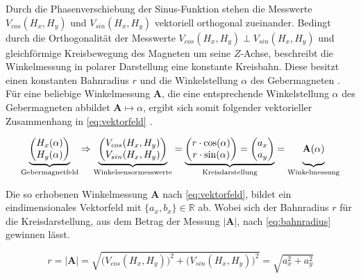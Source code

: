 Durch die Phasenverschiebung der Sinus-Funktion stehen die Messwerte $V_{cos}(H_x,H_y)$ und $V_{sin}(H_x,H_y)$ 
vektoriell orthogonal zueinander. Bedingt durch die Orthogonalität der Messwerte $V_{cos}(H_x,H_y) \perp 
V_{sin}(H_x,H_y)$ und gleichförmige Kreisbewegung des Magneten um seine $Z$-Achse, beschreibt die Winkelmessung in 
polarer Darstellung eine konstante Kreisbahn. Diese besitzt einen konstanten Bahnradius $r$ und die Winkelstellung 
$\alpha$ des Gebermagneten \cite{Schuethe2019}.
\newline
Für eine beliebige Winkelmessung $\mathbf{A}$, die eine entsprechende Winkelstellung $\alpha$ des Gebermagneten 
abbildet $\mathbf{A}\mapsto\alpha$, ergibt sich somit folgender vektorieller Zusammenhang in \autoref{eq:vektorfeld} 
\cite{Schuethe2020}.


\begin{equation}\label{eq:vektorfeld}
\underbrace{\begin{pmatrix} H_x(\alpha) \\ H_y(\alpha) \end{pmatrix}}_{\textrm{Gebermagnetfeld}}\Rightarrow
\underbrace{
	\begin{pmatrix} V_{cos}(H_x,H_y) \\ V_{sin}(H_x,H_y) \end{pmatrix}}_{\textrm{Winkelsensormesswerte}}=
\underbrace{
	\begin{pmatrix} r\cdot\cos(\alpha) \\ r\cdot\sin(\alpha)\end{pmatrix}=
	\begin{pmatrix} a_x \\ a_y \end{pmatrix}}_{\textrm{Kreisdarstellung}}=
\underbrace{\mathbf{A}(\alpha) \vphantom{\begin{pmatrix}x\\y\end{pmatrix}}}_{\textrm{Winkelmessung}}
\end{equation}

Die so erhobenen Winkelmessung $\mathbf{A}$ nach \autoref{eq:vektorfeld}, bildet ein eindimensionales Vektorfeld mit 
$\{a_x,b_x\}\in\mathbb{R}$ ab. Wobei sich der Bahnradius $r$ für die Kreisdarstellung, aus dem Betrag der Messung 
$|\mathbf{A}|$, nach \autoref{eq:bahnradius} gewinnen lässt.


\begin{equation}\label{eq:bahnradius}
r = |\mathbf{A}| = \sqrt{\big(V_{cos}(H_x,H_y)\big)^2 + \big(V_{sin}(H_x,H_y)\big)^2} =\sqrt{a_x^2 + a_y^2}
\end{equation}


